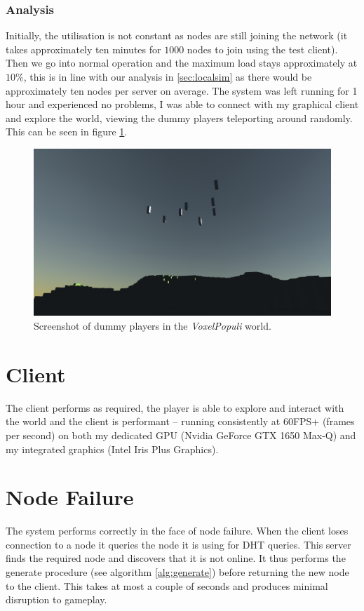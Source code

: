 \documentclass[12pt,notitlepage,a4paper]{report}
\newcommand{\voxpop}{\emph{VoxelPopuli}}
\begin{document}
	\subsubsection{Analysis}
	Initially, the utilisation is not constant as nodes are still joining the network (it takes approximately ten minutes for $1000$ nodes to join using the test client). Then we go into normal operation and the maximum load stays approximately at $10\%$, this is in line with our analysis in \cref{sec:localsim} as there would be approximately ten nodes per server on average. The system was left running for 1 hour and experienced no problems, I was able to connect with my graphical client and explore the world, viewing the dummy players teleporting around randomly. This can be seen in figure \ref{fig:dummies}.
	\begin{figure}
		\includegraphics[width=\textwidth]{dummies.png}
		\caption{Screenshot of dummy players in the \voxpop{} world.}
		\label{fig:dummies}
	\end{figure}

	\section{Client}
	The client performs as required, the player is able to explore and interact with the world and the client is performant -- running consistently at 60FPS+ (frames per second) on both my dedicated GPU (Nvidia GeForce GTX 1650 Max-Q) and my integrated graphics (Intel Iris Plus Graphics).

	\section{Node Failure}
	The system performs correctly in the face of node failure. When the client loses connection to a node it queries the node it is using for DHT queries. This server finds the required node and discovers that it is not online. It thus performs the generate procedure (see algorithm \ref{alg:generate}) before returning the new node to the client. This takes at most a couple of seconds and produces minimal disruption to gameplay.
	
\end{document}
